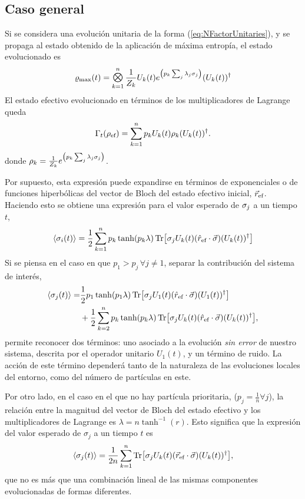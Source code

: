 \subsection{Caso general}

Si se considera una evolución unitaria de la forma (\ref{eq:NFactorUnitaries}), y se propaga al estado obtenido de la aplicación de máxima entropía, el estado evolucionado es
\begin{equation}
    \varrho_{\max}(t)=\Motimes_{k=1}^{n}\frac{1}{Z_{k}}U_{k}(t) e^{\qty(p_{k}\sum_{j}\lambda_{j}\pauli{j})} (U_{k}(t))^{\dag}\nonumber
\end{equation}
El estado efectivo evolucionado en términos de los multiplicadores de Lagrange queda
\begin{equation}\label{eq:SeparableEvolution}
    \Gamma_{t}(\rho_{\text{ef}})=\sum_{k=1}^{n}p_{k} U_{k}(t) \rho_{k} (U_{k}(t))^{\dag}.
\end{equation}
donde $\rho_{k}=\frac{1}{Z_{k}}e^{\qty(p_{k}\sum_{j}\lambda_{j}\sigma_{j})}$. 

Por supuesto, esta expresión puede expandirse en términos de exponenciales o de funciones hiperbólicas del vector de Bloch del estado efectivo inicial, $\vec{r}_{\text{ef}}$. Haciendo esto se obtiene una expresión para el valor esperado de $\sigma_{j}$ a un tiempo $t$,
\begin{equation}\label{eq:SeparableEvolutionExpVal}
    \expval{\sigma_{i}(t)}=\frac{1}{2}\sum_{k=1}^{n}p_{k}\tanh(p_{k}\lambda)\Tr[\sigma_{j}U_{k}(t) (\hat{r}_{\text{ef}}\cdot\vec{\sigma}) (U_{k}(t))^{\dag}]
\end{equation}
Si se piensa en el caso en que $p_{1}>p_{j}\,\forall j\neq 1$, separar la contribución del sistema de interés,
\begin{align}
    \expval{\sigma_{j}(t)}=&\frac{1}{2}p_{1}\tanh(p_{1}\lambda)\Tr[\sigma_{j}U_{1}(t) (\hat{r}_{\text{ef}}\cdot\vec{\sigma}) (U_{1}(t))^{\dag}]\nonumber\\
    &+\frac{1}{2}\sum_{k=2}^{n}p_{k}\tanh(p_{k}\lambda)\Tr[\sigma_{j}U_{k}(t) (\hat{r}_{\text{ef}}\cdot\vec{\sigma}) (U_{k}(t))^{\dag}]\nonumber,
\end{align}
permite reconocer dos términos: uno asociado a la evolución \textit{sin error} de nuestro sistema, descrita por el operador unitario $U_{1}(t)$, y un término de ruido. La acción de este término dependerá tanto de la naturaleza de las evoluciones locales del entorno, como del número de partículas en este.


Por otro lado, en el caso en el que no hay partícula prioritaria, \ie ($p_{j}=\frac{1}{n}\forall j$), la relación entre la magnitud del vector de Bloch del estado efectivo y los multiplicadores de Lagrange es $\lambda=n\tanh^{-1}(r)$. Esto significa que la expresión del valor esperado de $\sigma_{j}$ a un tiempo $t$ es
\begin{equation}
    \expval{\sigma_{j}(t)}=\frac{1}{2n}\sum_{k=1}^{n}\Tr[\sigma_{j}U_{k}(t) (\vec{r}_{\text{ef}}\cdot\vec{\sigma}) (U_{k}(t))^{\dag}],\nonumber
\end{equation}
que no es más que una combinación lineal de las mismas componentes evolucionadas de formas diferentes.
